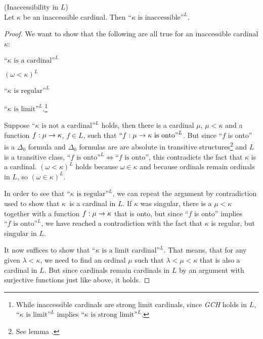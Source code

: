 
\begin{theorem}{(Inaccessibility in $L$)}\label{theorem:inaccessible_in_l}\\
Let $\kappa$ be an inaccessible cardinal. Then $\mbox{``$\kappa$ is inaccessible''}^L$.
\end{theorem}
\begin{proof}
We want to show that the following are all true for an inaccessible cardinal $\kappa$:
\bce[(i)] 
\item $\mbox{``$\kappa$ is a cardinal''}^L$
\item $(\omega < \kappa)^L$
\item $\mbox{``$\kappa$ is regular''}^L$
\item $\mbox{``$\kappa$ is limit''}^L$.\footnote{While inaccessible cardinals are strong limit cardinals, since \emph{GCH} holds in $L$, $\mbox{``$\kappa$ is limit''}^L$ 
implies $\mbox{``$\kappa$ is strong limit''}^L$.}
\ece

Suppose $\mbox{``$\kappa$ is not a cardinal''}^L$ holds, then there is a cardinal $\mu$, $\mu < \kappa$ and a function $f:\mu\rightarrow\kappa$, $f \in L$, such that $\mbox{``$f:\mu\rightarrow\kappa$ is onto''}^L$. But since ``$f$ is onto'' is a $\Delta_0$ formula and $\Delta_0$ formulas are are absolute in transitive structures\footnote{See lemma .} and $L$ is a transitive class, $\mbox{``$f$ is onto''}^L \iff \mbox{``$f$ is onto''}$, this contradicts the fact that $\kappa$ is a cardinal.
$(\omega < \kappa)^L$ holds because $\omega \in \kappa$ and because ordinals remain ordinals in $L$, so $(\omega \in \kappa)^L$.

In order to see that $\mbox{``$\kappa$ is regular''}^L$, we can repeat the argument by contradiction used to show that $\kappa$ is a cardinal in $L$. If $\kappa$ was singular, there is a $\mu < \kappa$ together with a function $f: \mu \rightarrow \kappa$ that is onto, but since ``$f$ is onto'' implies $\mbox{``$f$ is onto''}^L$, we have reached a contradiction with the fact that $\kappa$ is regular, but singular in $L$.

It now suffices to show that $\mbox{``$\kappa$ is a limit cardinal''}^L$. That means, that for any given $\lambda<\kappa$, we need to find an ordinal $\mu$ such that $\lambda < \mu < \kappa$ that is also a cardinal in $L$. But since cardinals remain cardinals in $L$ by an argument with surjective functions just like above, it holds.\end{proof}

